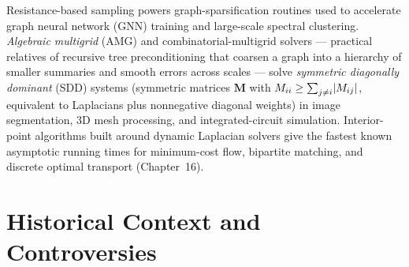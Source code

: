 \begin{applicationbox}
Resistance-based sampling powers graph-sparsification routines used to accelerate graph neural network (GNN) training and large-scale spectral clustering. \emph{Algebraic multigrid} (AMG) and combinatorial-multigrid solvers --- practical relatives of recursive tree preconditioning that coarsen a graph into a hierarchy of smaller summaries and smooth errors across scales --- solve \emph{symmetric diagonally dominant} (SDD) systems (symmetric matrices $\mathbf{M}$ with $M_{ii} \ge \sum_{j\ne i}\lvert M_{ij}\rvert$, equivalent to Laplacians plus nonnegative diagonal weights) in image segmentation, 3D mesh processing, and integrated-circuit simulation. Interior-point algorithms built around dynamic Laplacian solvers give the fastest known asymptotic running times for minimum-cost flow, bipartite matching, and discrete optimal transport (Chapter~16).
\end{applicationbox}

\section{Historical Context and Controversies}

